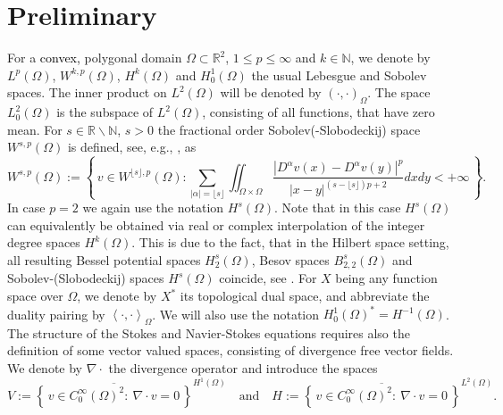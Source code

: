 \documentclass{m2an}
\newcommand\blue[1]{\textcolor{black}{#1}}
\newcommand{\R}{\mathbb{R}}
\newcommand{\N}{\mathbb{N}}
\newcommand{\Oprod}[1]{\left( #1 \right)_{\Omega}}
\newcommand{\Opair}[1]{\left\langle #1 \right\rangle_{\Omega}}
\newcommand{\MathSet}[1]{\left\lbrace \, #1 \, \right\rbrace}
\begin{document}
\section{Preliminary}\label{sec:preliminary}
For a \blue{convex,} polygonal domain $\Omega \subset \R^2$, $1 \le p\le \infty$ and $k \in \mathbb N$,
we denote by $L^p(\Omega)$, $W^{k,p}(\Omega)$, $H^k(\Omega)$ and $H^1_0(\Omega)$
the usual Lebesgue and Sobolev spaces.
The inner product on $L^2(\Omega)$ will be denoted by $\Oprod{\cdot , \cdot}$.
The space $L^2_0(\Omega)$ is the subspace of $L^2(\Omega)$, consisting of all functions,
that have zero mean.
For $s \in \R\backslash \N$, $s>0$ the fractional order Sobolev(-Slobodeckij)
space $W^{s,p}(\Omega)$ is defined, see, e.g., \cite{demengel_functional_2012}, as
\begin{equation*}
  W^{s,p}(\Omega) := \MathSet{ v \in W^{\lfloor s\rfloor,p}(\Omega) : 
  \sum_{|\alpha|=\lfloor s \rfloor} \iint_{\Omega \times \Omega} 
  \dfrac{|D^\alpha v(x) - D^\alpha v(y)|^p}{|x-y|^{(s-\lfloor s\rfloor)p+2}}
  dx dy < + \infty}.
\end{equation*}
In case $p=2$ we again use the notation $H^s(\Omega)$. Note that in this case $H^s(\Omega)$ 
can equivalently be obtained via real or complex
interpolation of the integer degree spaces $H^k(\Omega)$.
This is due to the fact, that in the Hilbert space setting, all resulting Bessel potential spaces
$H^s_2(\Omega)$, Besov spaces $B^s_{2,2}(\Omega)$ and Sobolev-(Slobodeckij) spaces $H^s(\Omega)$ coincide,
see \cite[pp. 12,39]{triebel_theory_1992}.
For $X$ being any function space over $\Omega$, we denote by $X^*$ its topological dual space,
and abbreviate the duality pairing by $\Opair{\cdot , \cdot}$. We will also use the notation
$H^1_0(\Omega)^* = H^{-1}(\Omega)$.
The structure of the Stokes and Navier-Stokes equations requires also the definition of 
some vector valued spaces, consisting of divergence free vector fields.
We denote by $\nabla \cdot$ the divergence operator and introduce the spaces
\begin{equation*}
  V:= \overline{\MathSet{ v \in C^\infty_0(\Omega)^2:
  \ \nabla \cdot v = 0 }}^{H^1(\Omega)}
  \quad \text{and} \quad
  H:= \overline{ \MathSet{ v \in C^\infty_0(\Omega)^2 :
  \ \nabla \cdot v = 0 }}^{L^2(\Omega)}.
\end{equation*}
\end{document}
